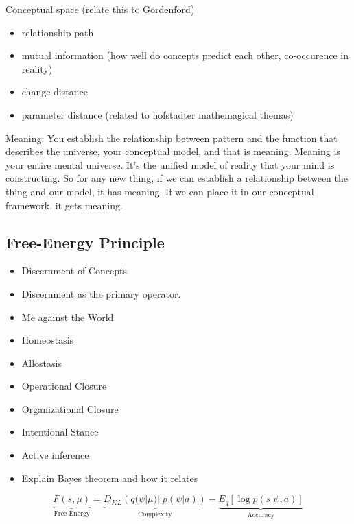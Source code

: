 Conceptual space (relate this to Gordenford)
\begin{itemize}
    \item relationship path 
    \item mutual information (how well do concepts predict each other, co-occurence in reality)
    \item change distance
    \item parameter distance (related to hofstadter mathemagical themas)
\end{itemize}

Meaning: You establish the relationship between pattern and the function that describes the universe, your conceptual model, and that is meaning. Meaning is your entire mental universe. It's the unified model of reality that your mind is constructing. So for any new thing, if we can establish a relationship between the thing and our model, it has meaning. If we can place it in our conceptual framework, it gets meaning. 


\subsection{Free-Energy Principle}
\begin{itemize}
    \item Discernment of Concepts
    \item Discernment as the primary operator. 
    \item Me against the World
    \item Homeostasis
    \item Allostasis
    \item Operational Closure
    \item Organizational Closure
    \item Intentional Stance
    \item Active inference
    \item Explain Bayes theorem and how it relates 
\end{itemize}

\begin{equation}
    \underbrace{F(s, \mu)}_{\text{Free Energy}} = \underbrace{D_{KL}\left(q(\psi|\mu) || p(\psi|a)\right)}_{\text{Complexity}} - \underbrace{E_q\left[\log p(s|\psi, a)\right]}_{\text{Accuracy}}
\end{equation}

